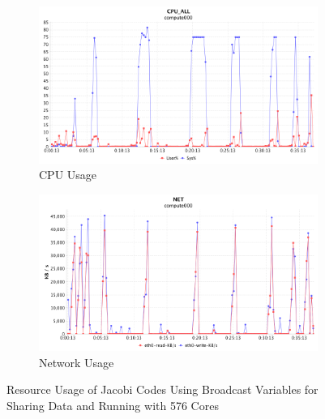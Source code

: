 \begin{figure}[!ht]
\centering
\begin{subfigure}{1\textwidth}
  \centering
  \includegraphics[width=1\linewidth]{figures/JacobiBC131_576_CPU.png}
  \caption{CPU Usage}
  \label{JacobiBC131_576_CPU}
\end{subfigure}
\begin{subfigure}{1\textwidth}
  \centering
  \includegraphics[width=1\linewidth]{figures/JacobiBC131_576_NET.png}
  \caption{Network Usage}
  \label{JacobiBC131_576_NET}
\end{subfigure}
\caption{Resource Usage of Jacobi Codes Using Broadcast Variables for Sharing Data and Running with 576 Cores}
\label{JacobiBC131_576}
\end{figure}

